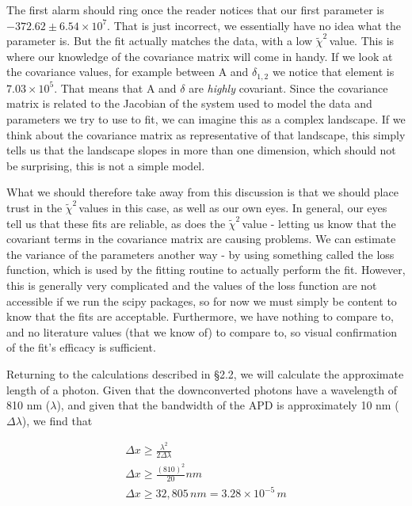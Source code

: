 \documentclass{article}
\newcommand{\redchi}{$\tilde{\chi}^2\,$}
\begin{document}
\hspace{.25cm}

The first alarm should ring once the reader notices that our first parameter is $-372.62 \pm 6.54 \times 10^7$.  That is just incorrect, we essentially have no idea what the parameter is.  But the fit actually matches the data, with a low \redchi value.  This is where our knowledge of the covariance matrix will come in handy.  If we look at the covariance values, for example between A and $\delta_{1,2}$ we notice that element is $7.03 \times 10^5$.  That means that A and $\delta$ are \emph{highly} covariant.  Since the covariance matrix is related to the Jacobian of the system used to model the data and parameters we try to use to fit, we can imagine this as a complex landscape.  If we think about the covariance matrix as representative of that landscape, this simply tells us that the landscape slopes in more than one dimension, which should not be surprising, this is not a simple model.

\hspace{.25cm}

What we should therefore take away from this discussion is that we should place trust in the \redchi values in this case, as well as our own eyes.  In general, our eyes tell us that these fits are reliable, as does the \redchi value - letting us know that the covariant terms in the covariance matrix are causing problems.  We can estimate the variance of the parameters another way - by using something called the loss function, which is used by the fitting routine to actually perform the fit.  However, this is generally very complicated and the values of the loss function are not accessible if we run the scipy packages, so for now we must simply be content to know that the fits are acceptable.  Furthermore, we have nothing to compare to, and no literature values (that we know of) to compare to, so visual confirmation of the fit's efficacy is sufficient.

\hspace{.25cm}

Returning to the calculations described in \S 2.2, we will calculate the approximate length of a photon.  Given that the downconverted photons have a wavelength of 810 nm ($\lambda$), and given that the bandwidth of the APD is approximately 10 nm ($\Delta \lambda$), we find that

\begin{gather}
	\Delta x \geq \frac{\lambda^2}{2\Delta \lambda} \\
	\Delta x \geq \frac{(810)^2}{20} nm \\
	\Delta x \geq 32,805 \, nm = 3.28 \times 10^{-5} \, m
\end{gather}
\end{document}
